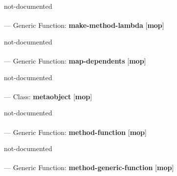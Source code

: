\begin{adjustwidth}{5em}{5em}
not-documented
\end{adjustwidth}

\paragraph{}
\label{MOP:MAKE-METHOD-LAMBDA}
--- Generic Function: \textbf{make-method-lambda} [\textbf{mop}] \textit{}

\begin{adjustwidth}{5em}{5em}
not-documented
\end{adjustwidth}

\paragraph{}
\label{MOP:MAP-DEPENDENTS}
--- Generic Function: \textbf{map-dependents} [\textbf{mop}] \textit{}

\begin{adjustwidth}{5em}{5em}
not-documented
\end{adjustwidth}

\paragraph{}
\label{MOP:METAOBJECT}
--- Class: \textbf{metaobject} [\textbf{mop}] \textit{}

\begin{adjustwidth}{5em}{5em}
not-documented
\end{adjustwidth}

\paragraph{}
\label{MOP:METHOD-FUNCTION}
--- Generic Function: \textbf{method-function} [\textbf{mop}] \textit{}

\begin{adjustwidth}{5em}{5em}
not-documented
\end{adjustwidth}

\paragraph{}
\label{MOP:METHOD-GENERIC-FUNCTION}
--- Generic Function: \textbf{method-generic-function} [\textbf{mop}] \textit{}

